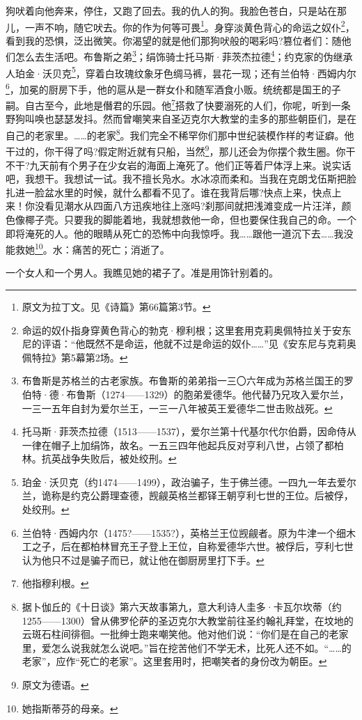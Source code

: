 \par 狗吠着向他奔来，停住，又跑了回去。我的仇人的狗。我脸色苍白，只是站在那儿，一声不响，随它吠去。你的作为何等可畏\footnote{原文为拉丁文。见《诗篇》第66篇第3节。}。身穿淡黄色背心的命运之奴仆\footnote{命运的奴仆指身穿黄色背心的勃克·穆利根；这里套用克莉奥佩特拉关于安东尼的评语：“他既然不是命运，他就不过是命运的奴仆……”见《安东尼与克莉奥佩特拉》第5幕第2场。}，看到我的恐惧，泛出微笑。你渴望的就是他们那狗吠般的喝彩吗?篡位者们：随他们怎么去生活吧。布鲁斯之弟\footnote{布鲁斯是苏格兰的古老家族。布鲁斯的弟弟指一三〇六年成为苏格兰国王的罗伯特·德·布鲁斯（1274——1329）的胞弟爱德华。他代替乃兄攻入爱尔兰，一三一五年自封为爱尔兰王，一三一八年被英王爱德华二世击败战死。}；绢饰骑士托马斯·菲茨杰拉德\footnote{托马斯·菲茨杰拉德（1513——1537），爱尔兰第十代基尔代尔伯爵，因命侍从一律在帽子上加绢饰，故名。一五三四年他起兵反对亨利八世，占领了都柏林。抗英战争失败后，被处绞刑。}；约克家的伪继承人珀金·沃贝克\footnote{珀金·沃贝克（约1474——1499），政治骗子，生于佛兰德。一四九一年去爱尔兰，诡称是约克公爵理查德，觊觎英格兰都铎王朝亨利七世的王位。后被俘，处绞刑。}，穿着白玫瑰纹象牙色绸马裤，昙花一现；还有兰伯特·西姆内尔\footnote{兰伯特·西姆内尔（1475?——1535?），英格兰王位觊觎者。原为牛津一个细木工之子，后在都柏林冒充王子登上王位，自称爱德华六世。被俘后，亨利七世认为他只不过是骗子而已，就让他在御厨房里打下手。}，加冕的厨房下手，他的扈从是一群女仆和随军酒食小贩。统统都是国王的子嗣。自古至今，此地是僭君的乐园。他\footnote{他指穆利根。}搭救了快要溺死的人们，你呢，听到一条野狗叫唤也瑟瑟发抖。然而曾嘲笑来自圣迈克尔大教堂的圭多的那些朝臣们，是在自己的老家里。……的老家\footnote{据卜伽丘的《十日谈》第六天故事第九，意大利诗人圭多·卡瓦尔坎蒂（约1255——1300）曾从佛罗伦萨的圣迈克尔大教堂前往圣约翰礼拜堂，在坟地的云斑石柱间徘徊。一批绅士跑来嘲笑他。他对他们说：“你们是在自己的老家里，爱怎么说我就怎么说吧。”旨在挖苦他们不学无术，比死人还不如。“……的老家”，应作“死亡的老家”。这里套用时，把嘲笑者的身份改为朝臣。}。我们完全不稀罕你们那中世纪装模作样的考证癖。他干过的，你干得了吗?假定附近就有只船，当然\footnote{原文为德语。}，那儿还会为你摆个救生圈。你干不干?九天前有个男子在少女岩的海面上淹死了。他们正等着尸体浮上来。说实话吧，我想干。我想试一试。我不擅长凫水。水冰凉而柔和。当我在克朗戈伍斯把脸扎进一脸盆水里的时候，就什么都看不见了。谁在我背后哪?快点上来，快点上来！你没看见潮水从四面八方迅疾地往上涨吗?刹那间就把浅滩变成一片汪洋，颜色像椰子壳。只要我的脚能着地，我就想救他一命，但也要保住我自己的命。一个即将淹死的人。他的眼睛从死亡的恐怖中向我惊呼。我……跟他一道沉下去……我没能救她\footnote{她指斯蒂芬的母亲。}。水：痛苦的死亡；消逝了。
\par 一个女人和一个男人。我瞧见她的裙子了。准是用饰针别着的。
